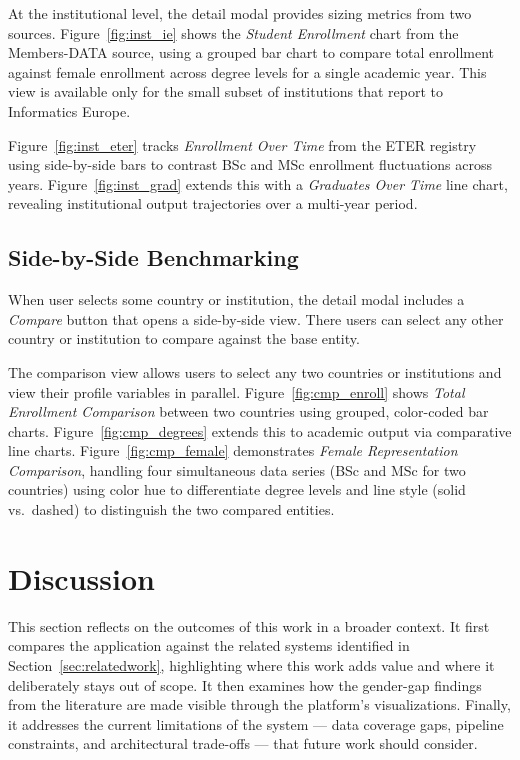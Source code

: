 \documentclass[final,3p,times,twocolumn]{elsarticle}
\begin{document}
At the institutional level, the detail modal provides sizing metrics from two sources. Figure~\ref{fig:inst_ie} shows the \textit{Student Enrollment} chart from the Members-DATA source, using a grouped bar chart to compare total enrollment against female enrollment across degree levels for a single academic year. This view is available only for the small subset of institutions that report to Informatics Europe.

Figure~\ref{fig:inst_eter} tracks \textit{Enrollment Over Time} from the ETER registry using side-by-side bars to contrast BSc and MSc enrollment fluctuations across years. Figure~\ref{fig:inst_grad} extends this with a \textit{Graduates Over Time} line chart, revealing institutional output trajectories over a multi-year period.

\subsection{Side-by-Side Benchmarking}

When user selects some country or institution, the detail modal includes a \textit{Compare} button that opens a side-by-side view. There users can select any other country or institution to compare against the base entity.

The comparison view allows users to select any two countries or institutions and view their profile variables in parallel. Figure~\ref{fig:cmp_enroll} shows \textit{Total Enrollment Comparison} between two countries using grouped, color-coded bar charts. Figure~\ref{fig:cmp_degrees} extends this to academic output via comparative line charts. Figure~\ref{fig:cmp_female} demonstrates \textit{Female Representation Comparison}, handling four simultaneous data series (BSc and MSc for two countries) using color hue to differentiate degree levels and line style (solid vs.\ dashed) to distinguish the two compared entities.

\section{Discussion}
\label{sec:discussion}

This section reflects on the outcomes of this work in a broader context. It first compares the application against the related systems identified in Section~\ref{sec:relatedwork}, highlighting where this work adds value and where it deliberately stays out of scope. It then examines how the gender-gap findings from the literature are made visible through the platform's visualizations. Finally, it addresses the current limitations of the system — data coverage gaps, pipeline constraints, and architectural trade-offs — that future work should consider.
\end{document}
